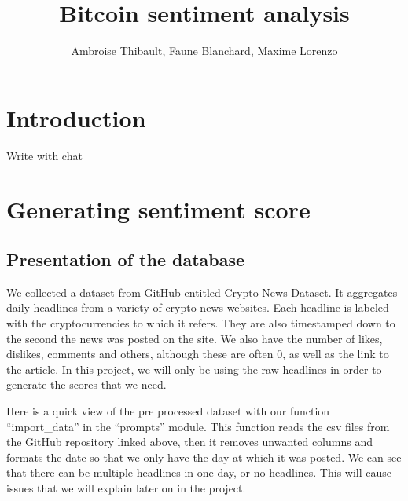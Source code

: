 \documentclass[
  a4paper]{article}
\title{Bitcoin sentiment analysis}
\author{Ambroise Thibault, Faune Blanchard, Maxime Lorenzo}
\date{}
\renewcommand*\contentsname{Table of contents}
\newcommand\contentsname{Table of contents}
\begin{document}
\maketitle
\ifdefined\Shaded\renewenvironment{Shaded}{\begin{tcolorbox}[boxrule=0pt, breakable, enhanced, interior hidden, frame hidden, borderline west={3pt}{0pt}{shadecolor}, sharp corners]}{\end{tcolorbox}}\fi

\renewcommand*\contentsname{Table of contents}
{
\hypersetup{linkcolor=}
\setcounter{tocdepth}{4}
\tableofcontents
}
\hypertarget{introduction}{%
\section{Introduction}\label{introduction}}

Write with chat

\hypertarget{generating-sentiment-score}{%
\section{Generating sentiment score}\label{generating-sentiment-score}}

\hypertarget{presentation-of-the-database}{%
\subsection{Presentation of the
database}\label{presentation-of-the-database}}

We collected a dataset from GitHub entitled
\href{https://github.com/soheilrahsaz/cryptoNewsDataset}{Crypto News
Dataset}. It aggregates daily headlines from a variety of crypto news
websites. Each headline is labeled with the cryptocurrencies to which it
refers. They are also timestamped down to the second the news was posted
on the site. We also have the number of likes, dislikes, comments and
others, although these are often 0, as well as the link to the article.
In this project, we will only be using the raw headlines in order to
generate the scores that we need.

Here is a quick view of the pre processed dataset with our function
``import\_data'' in the ``prompts'' module. This function reads the csv
files from the GitHub repository linked above, then it removes unwanted
columns and formats the date so that we only have the day at which it
was posted. We can see that there can be multiple headlines in one day,
or no headlines. This will cause issues that we will explain later on in
the project.
\end{document}
